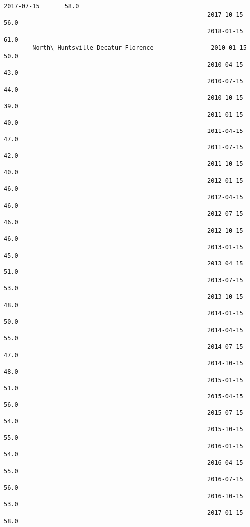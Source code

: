\documentclass[11pt]{article}
\begin{document}
\begin{Verbatim}[commandchars=\\\{\}]
                                                         2017-07-15       58.0   
                                                         2017-10-15       56.0   
                                                         2018-01-15       61.0   
        North\_Huntsville-Decatur-Florence                2010-01-15       50.0   
                                                         2010-04-15       43.0   
                                                         2010-07-15       44.0   
                                                         2010-10-15       39.0   
                                                         2011-01-15       40.0   
                                                         2011-04-15       47.0   
                                                         2011-07-15       42.0   
                                                         2011-10-15       40.0   
                                                         2012-01-15       46.0   
                                                         2012-04-15       46.0   
                                                         2012-07-15       46.0   
                                                         2012-10-15       46.0   
                                                         2013-01-15       45.0   
                                                         2013-04-15       51.0   
                                                         2013-07-15       53.0   
                                                         2013-10-15       48.0   
                                                         2014-01-15       50.0   
                                                         2014-04-15       55.0   
                                                         2014-07-15       47.0   
                                                         2014-10-15       48.0   
                                                         2015-01-15       51.0   
                                                         2015-04-15       56.0   
                                                         2015-07-15       54.0   
                                                         2015-10-15       55.0   
                                                         2016-01-15       54.0   
                                                         2016-04-15       55.0   
                                                         2016-07-15       56.0   
                                                         2016-10-15       53.0   
                                                         2017-01-15       58.0   

\end{Verbatim}
\end{document}

